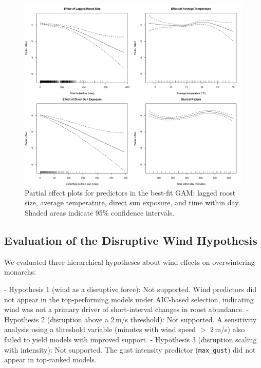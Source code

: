 

\begin{figure}[H]
  \centering
  \includegraphics[width=\textwidth]{supplemental/results/thesis_exports/figures/combined_partial_effects.png}
  \caption{Partial effect plots for predictors in the best-fit GAM: lagged roost size, average temperature, direct sun exposure, and time within day. Shaded areas indicate 95\% confidence intervals.}
  \label{fig:partial_effects}
\end{figure}

\subsection{Evaluation of the Disruptive Wind Hypothesis}

We evaluated three hierarchical hypotheses about wind effects on overwintering monarchs:

- Hypothesis 1 (wind as a disruptive force): Not supported. Wind predictors did not appear in the top-performing models under AIC-based selection, indicating wind was not a primary driver of short-interval changes in roost abundance.
- Hypothesis 2 (disruption above a 2\,m/s threshold): Not supported. A sensitivity analysis using a threshold variable (minutes with wind speed \(>\) 2\,m/s) also failed to yield models with improved support.
- Hypothesis 3 (disruption scaling with intensity): Not supported. The gust intensity predictor (\texttt{max\_gust}) did not appear in top-ranked models.

